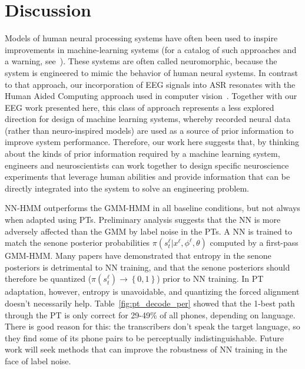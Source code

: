 \section{Discussion}

Models of human neural processing systems have often been used to
inspire improvements in machine-learning systems (for a catalog of
such approaches and a warning, see~\cite{Bourlard96}).  These systems
are often called neuromorphic, because the system is engineered to
mimic the behavior of human neural systems. In contrast to that
approach, our incorporation of EEG signals into ASR resonates with the
Human Aided Computing approach used in computer
vision~\cite{Shenoy08,Wang09}. Together with our EEG work presented
here, this class of approach represents a less explored direction for
design of machine learning systems, whereby recorded neural data
(rather than neuro-inspired models) are used as a source of prior
information to improve system performance. Therefore, our work here
suggests that, by thinking about the kinds of prior information
required by a machine learning system, engineers and neuroscientists
can work together to design specific neuroscience experiments that
leverage human abilities and provide information that can be directly
integrated into the system to solve an engineering problem.

NN-HMM outperforms the GMM-HMM in all baseline conditions, but not always
when adapted using PTs.  Preliminary analysis suggests that the NN is
more adversely affected than the GMM by label noise in the PTs.  A NN
is trained to match the senone posterior probabilities
$\pi(s_t^\ell|x^\ell,\phi^\ell,\theta)$ computed by a first-pass
GMM-HMM.  Many papers have demonstrated that entropy in the senone
posteriors is detrimental to NN training, and that the senone
posteriors should therefore be quantized
($\pi(s_t^\ell)\rightarrow\left\{0,1\right\}$) prior to NN training.
In PT adaptation, however, entropy is unavoidable, and quantizing the
forced alignment doesn't necessarily help.  Table~\ref{fig:pt_decode_per}
showed that the 1-best path through the PT is only correct for 29-49\%
of all phones, depending on language.  There is good reason for this:
the transcribers don't speak the target language, so they find some of
its phone pairs to be perceptually indistinguishable.  Future work
will seek methods that can improve the robustness of NN training in
the face of label noise.  

